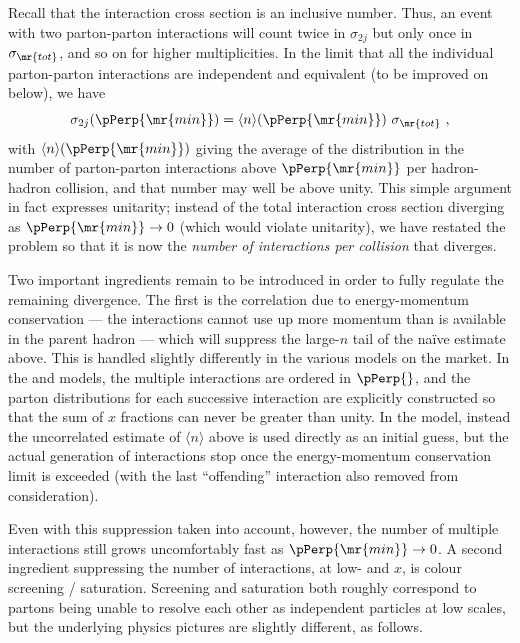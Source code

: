 Recall that the interaction cross section is an inclusive
number. Thus, an event with two parton-parton interactions will count
twice in $\sigma_{2j}$ but only once in $\sigma_{\mr{tot}}$,
and so on for higher multiplicities. In the limit that all the
individual parton-parton interactions are independent and equivalent
(to be improved on below), we have
\begin{equation}
\sigma_{2j}(\pPerp{\mr{min}}) = \langle n \rangle(\pPerp{\mr{min}})
\ \sigma_{\mr{tot}} ~,
\end{equation}
with $ \langle n \rangle(\pPerp{\mr{min}})$ giving the
average of the distribution in the number of parton-parton interactions
above $\pPerp{\mr{min}}$ per hadron-hadron collision,
and that number may well be above unity.
This simple argument in fact expresses unitarity;
instead of the total interaction cross section diverging as $\pPerp{\mr{min}}\to 0$ (which would violate
unitarity), we have restated the problem so
that it is now the \emph{number of interactions per collision} that
diverges.

Two important ingredients remain to be introduced in order to fully
regulate the remaining divergence. The first is the correlation due to
energy-momentum conservation --- the interactions cannot use up more
momentum than is available in the parent hadron ---
which will suppress the large-$n$ tail of the na\"ive estimate above.
This is handled slightly differently in the various models on the market.
In the \pythia and \Sherpa models, the
multiple interactions are ordered in $\pPerp{}$, and the parton
distributions for each successive
interaction are explicitly constructed so
that the sum of $x$ fractions can never be greater than unity. In
the \herwigpp model, instead the uncorrelated estimate of
$\langle n \rangle$ above is used directly as an initial guess, but the actual
generation of interactions stop once the energy-momentum conservation
limit is exceeded (with the last ``offending'' interaction also
removed from consideration).

Even with this suppression taken into account, however, the number of
multiple interactions still grows uncomfortably fast as $\pPerp{\mr{min}}\to
0$. A second ingredient suppressing the number of interactions,
at low-\pPerp{} and $x$, is colour screening /
saturation. Screening and saturation both roughly correspond to
partons being unable to resolve each other as independent particles
at low scales, but the underlying physics pictures are slightly
different, as follows.

